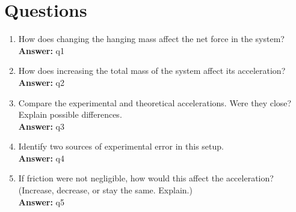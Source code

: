\documentclass[12pt]{article}
\begin{document}
\section*{Questions}

\begin{enumerate}[label=\arabic*.]
    \item How does changing the hanging mass affect the net force in the system?\\
    \textbf{Answer:} {{ q1 }}

    \item How does increasing the total mass of the system affect its acceleration?\\
    \textbf{Answer:} {{ q2 }}

    \item Compare the experimental and theoretical accelerations. Were they close? Explain possible differences.\\
    \textbf{Answer:} {{ q3 }}

    \item Identify two sources of experimental error in this setup.\\
    \textbf{Answer:} {{ q4 }}

    \item If friction were not negligible, how would this affect the acceleration? (Increase, decrease, or stay the same. Explain.)\\
    \textbf{Answer:} {{ q5 }}
\end{enumerate}
\end{document}
